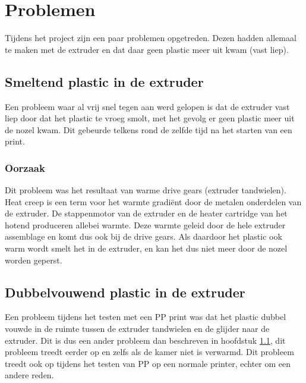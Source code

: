 \chapter{Problemen}
\label{Problemen}

Tijdens het project zijn een paar problemen opgetreden. Dezen hadden allemaal
te maken met de extruder en dat daar geen plastic meer uit kwam (vast liep).

\section{Smeltend plastic in de extruder}
\label{s:smeltendplastic}

Een probleem waar al vrij snel tegen aan werd gelopen is dat de extruder vast
liep door dat het plastic te vroeg smolt, met het gevolg er geen plastic meer uit de nozel kwam.
Dit gebeurde telkens rond de zelfde tijd na het starten van een print.

\subsection{Oorzaak}

Dit probleem was het resultaat van warme drive gears (extruder tandwielen).
Heat creep is een term voor het warmte gradiënt door de metalen onderdelen van
de extruder. De stappenmotor van de extruder en de heater cartridge van het
hotend produceren allebei warmte. Deze warmte geleid door de hele extruder
assemblage en komt dus ook bij de drive gears. Als daardoor het plastic ook
warm wordt smelt het in de extruder, en kan het dus niet meer door de nozel
worden geperst.

\section{Dubbelvouwend plastic in de extruder}
\label{s:Dubbelvouwend}

Een probleem tijdens het testen met een PP print was dat het plastic dubbel
vouwde in de ruimte tussen de extruder tandwielen en de glijder naar de
extruder. Dit is dus een ander probleem dan beschreven in hoofdstuk
\ref{s:smeltendplastic}, dit probleem treedt eerder op en zelfs als de kamer
niet is verwarmd. Dit probleem treedt ook op tijdens het testen van PP op een
normale printer, echter om een andere reden.

